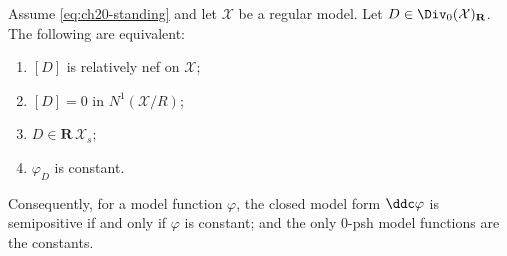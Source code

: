 \begin{theorem}
\label{thm:ch20-vertical-nef-rigidity}
Assume \eqref{eq:ch20-standing} and let \(\mathcal X\) be a regular model.
Let \(D\in\Div_0(\mathcal X)_{\mathbf R}\).  The following are equivalent:
\begin{enumerate}
\item\label{itm:ch20-rig:nef} \([D]\) is relatively nef on \(\mathcal X\);
\item\label{itm:ch20-rig:zero} \([D]=0\) in \(N^1(\mathcal X/R)\);
\item\label{itm:ch20-rig:prop} \(D\in\mathbf R\,\mathcal X_s\);
\item\label{itm:ch20-rig:const} \(\varphi_D\) is constant.
\end{enumerate}
Consequently, for a model function \(\varphi\), the closed model form
\(\ddc\varphi\) is semipositive if and only if \(\varphi\) is constant; and
the only \(0\)-psh model functions are the constants.
\end{theorem}

